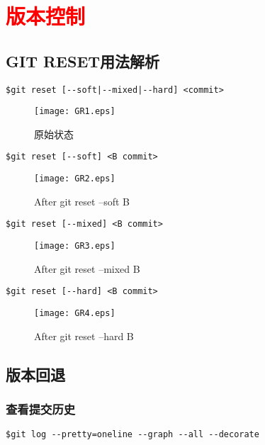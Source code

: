 \section{\textcolor{red}{\textbf{版本控制}}}

\subsection{\textbf{GIT RESET用法解析}}
\begin{lstlisting}
$git reset [--soft|--mixed|--hard] <commit>
\end{lstlisting}

\begin{figure}[!h]
  \centering
  \texttt{[image: GR1.eps]}
  \caption{原始状态}
\end{figure}


\begin{lstlisting}
$git reset [--soft] <B commit>
\end{lstlisting}
\begin{figure}[!h]
  \centering
  \texttt{[image: GR2.eps]}
  \caption{After git reset --soft B}
\end{figure}


\begin{lstlisting}
$git reset [--mixed] <B commit>
\end{lstlisting}
\begin{figure}[!h]
  \centering
  \texttt{[image: GR3.eps]}
  \caption{After git reset --mixed B}
\end{figure}


\begin{lstlisting}
$git reset [--hard] <B commit>
\end{lstlisting}
\begin{figure}[!h]
  \centering
  \texttt{[image: GR4.eps]}
  \caption{After git reset --hard B}
\end{figure}



\subsection{版本回退}
\subsubsection{查看提交历史}
\begin{lstlisting}
$git log --pretty=oneline --graph --all --decorate
\end{lstlisting}

